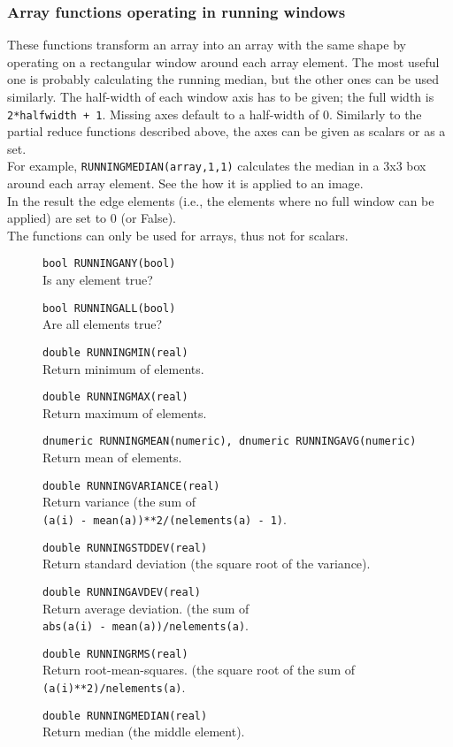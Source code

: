 \subsubsection{Array functions operating in running windows}
These functions transform an array into an array with the same shape
by operating on a rectangular window around each array element.
The most useful one is probably calculating the running median, but
the other ones can be used similarly.
The half-width of each window axis has to be given; the full width is
\texttt{2*halfwidth + 1}. Missing axes default to a half-width of 0.
Similarly to the partial reduce functions described above, the axes
can be given as scalars or as a set.
\\For example,
\texttt{RUNNINGMEDIAN(array,1,1)} calculates the median
in a 3x3 box around each array element.
See the  how it is applied to an image.
\\In the result the edge elements (i.e., the elements where no full
window can be applied) are set to 0 (or False).
\\The functions can only be used for arrays, thus not for scalars.
\begin{description}
  \item[] \texttt{bool RUNNINGANY(bool)}\\
    Is any element true?
  \item[] \texttt{bool RUNNINGALL(bool)}\\
    Are all elements true?
  \item[] \texttt{double RUNNINGMIN(real)}\\
    Return minimum of elements.
  \item[] \texttt{double RUNNINGMAX(real)}\\
    Return maximum of elements.
  \item[] \texttt{dnumeric RUNNINGMEAN(numeric), dnumeric RUNNINGAVG(numeric)}\\
    Return mean of elements.
  \item[] \texttt{double RUNNINGVARIANCE(real)}\\
    Return variance (the sum of
    \\\texttt{(a(i) - mean(a))**2/(nelements(a) - 1)}.
  \item[] \texttt{double RUNNINGSTDDEV(real)}\\
    Return standard deviation (the square root of the variance).
  \item[] \texttt{double RUNNINGAVDEV(real)}\\
    Return average deviation. (the sum of 
    \\\texttt{abs(a(i) - mean(a))/nelements(a)}.
  \item[] \texttt{double RUNNINGRMS(real)}\\
    Return root-mean-squares. (the square root of the sum of
    \\\texttt{(a(i)**2)/nelements(a)}.
  \item[] \texttt{double RUNNINGMEDIAN(real)}\\
    Return median (the middle element).
\end{description}

